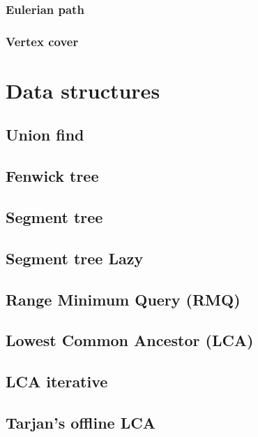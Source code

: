 \documentclass[a4paper]{article}
\begin{document}
\begin{multicols*}{2}
        \subsubsection{Eulerian path}
            
        \subsubsection{Vertex cover}
            

\section{Data structures}
    \subsection{Union find}
        
    \subsection{Fenwick tree}
        
    \subsection{Segment tree}
        
    \subsection{Segment tree Lazy}
        
    \subsection{Range Minimum Query (RMQ)}
        
    \subsection{Lowest Common Ancestor (LCA)}
        
    \subsection{LCA iterative}
        
    \subsection{Tarjan's offline LCA}
        

\end{multicols*}
\end{document}
